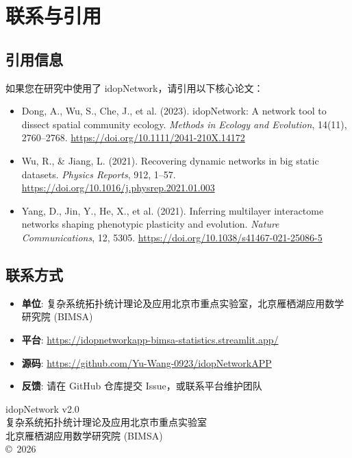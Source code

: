 \documentclass[12pt,a4paper]{ctexart}
\begin{document}
\section{联系与引用}

\subsection{引用信息}

如果您在研究中使用了 idopNetwork，请引用以下核心论文：

\begin{itemize}[leftmargin=*]
    \item Dong, A., Wu, S., Che, J., et al. (2023). idopNetwork: A network tool to dissect spatial community ecology. \textit{Methods in Ecology and Evolution}, 14(11), 2760--2768. \url{https://doi.org/10.1111/2041-210X.14172}
    \item Wu, R., \& Jiang, L. (2021). Recovering dynamic networks in big static datasets. \textit{Physics Reports}, 912, 1--57. \url{https://doi.org/10.1016/j.physrep.2021.01.003}
    \item Yang, D., Jin, Y., He, X., et al. (2021). Inferring multilayer interactome networks shaping phenotypic plasticity and evolution. \textit{Nature Communications}, 12, 5305. \url{https://doi.org/10.1038/s41467-021-25086-5}
\end{itemize}

\subsection{联系方式}

\begin{itemize}[leftmargin=*]
    \item \textbf{单位}: 复杂系统拓扑统计理论及应用北京市重点实验室，北京雁栖湖应用数学研究院 (BIMSA)
    \item \textbf{平台}: \url{https://idopnetworkapp-bimsa-statistics.streamlit.app/}
    \item \textbf{源码}: \url{https://github.com/Yu-Wang-0923/idopNetworkAPP}
    \item \textbf{反馈}: 请在 GitHub 仓库提交 Issue，或联系平台维护团队
\end{itemize}

\vspace{1.2cm}
\begin{center}
    \small\color{gray}
    idopNetwork v2.0 \\
    复杂系统拓扑统计理论及应用北京市重点实验室 \\
    北京雁栖湖应用数学研究院 (BIMSA) \\
    \copyright\ 2026
\end{center}
\end{document}
